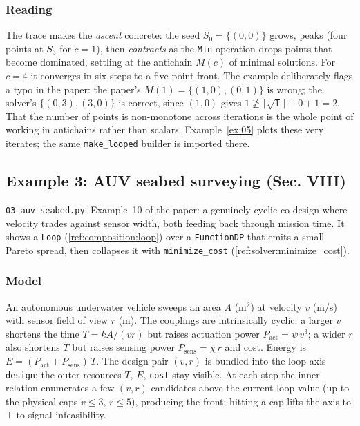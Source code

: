 \documentclass[11pt,a4paper]{article}
\newcommand{\topp}{\top}
\begin{document}
\subsubsection*{Reading}

The trace makes the \emph{ascent} concrete: the seed $S_0=\{(0,0)\}$ grows,
peaks (four points at $S_3$ for $c=1$), then \emph{contracts} as the
\texttt{Min} operation drops points that become dominated, settling at the
antichain $M(c)$ of minimal solutions. For $c=4$ it converges in six steps
to a five-point front. The example deliberately flags a typo in the paper:
the paper's $M(1)=\{(1,0),(0,1)\}$ is wrong; the solver's
$\{(0,3),(3,0)\}$ is correct, since $(1,0)$ gives
$1 \not\geq \lceil\sqrt1\rceil + 0 + 1 = 2$. That the number of points is
non-monotone across iterations is the whole point of working in
antichains rather than scalars. Example~\ref{ex:05} plots these very
iterates; the same \texttt{make\_looped} builder is imported there.

\subsection{Example 3: AUV seabed surveying (Sec. VIII)}\label{ex:03}

\texttt{03\_auv\_seabed.py}. Example~10 of the paper: a genuinely cyclic
co-design where velocity trades against sensor width, both feeding back
through mission time. It shows a \texttt{Loop} (\ref{ref:composition:loop})
over a \texttt{FunctionDP} that emits a small Pareto spread, then collapses
it with \texttt{minimize\_cost} (\ref{ref:solver:minimize_cost}).

\subsubsection*{Model}

An autonomous underwater vehicle sweeps an area $A$ (m$^2$) at velocity
$v$ (m/s) with sensor field of view $r$ (m). The couplings are
intrinsically cyclic: a larger $v$ shortens the time
$T = kA/(vr)$ but raises actuation power $P_{\text{act}}=\psi\,v^3$; a
wider $r$ also shortens $T$ but raises sensing power
$P_{\text{sens}}=\chi\,r$ and cost. Energy is $E=(P_{\text{act}}+
P_{\text{sens}})\,T$. The design pair $(v,r)$ is bundled into the loop
axis \texttt{design}; the outer resources $T$, $E$, \texttt{cost} stay
visible. At each step the inner relation enumerates a few $(v,r)$
candidates above the current loop value (up to the physical caps
$v\le3$, $r\le5$), producing the front; hitting a cap lifts the axis to
$\topp$ to signal infeasibility.
\end{document}
